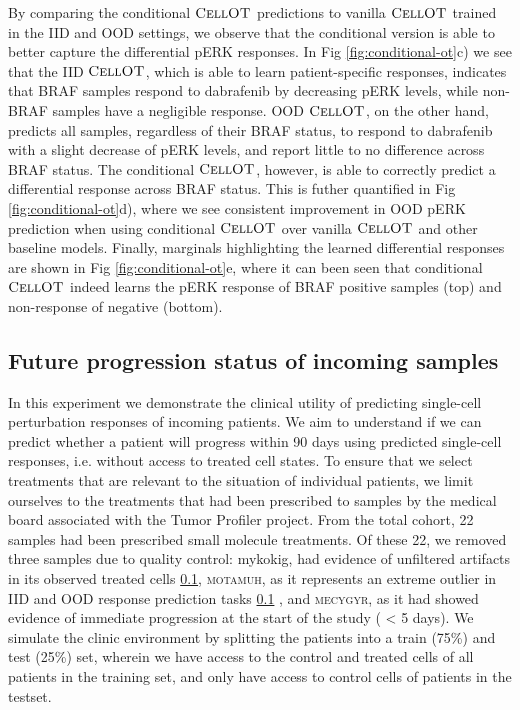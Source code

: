 By comparing the conditional $\textsc{CellOT}$ predictions to vanilla $\textsc{CellOT}$ trained in the IID and OOD settings, we observe that the conditional version is able to better capture the differential pERK responses.
In Fig \ref{fig:conditional-ot}c) we see that the IID $\textsc{CellOT}$, which is able to learn patient-specific responses, indicates that BRAF samples respond to dabrafenib by decreasing pERK levels, while non-BRAF samples have a negligible response.
OOD $\textsc{CellOT}$, on the other hand, predicts all samples, regardless of their BRAF status, to respond to dabrafenib with a slight decrease of pERK levels, and report little to no difference across BRAF status.
The conditional $\textsc{CellOT}$, however, is able to correctly predict a differential response across BRAF status.
This is futher quantified in Fig \ref{fig:conditional-ot}d), where we see consistent improvement in OOD pERK prediction when using conditional $\textsc{CellOT}$ over vanilla $\textsc{CellOT}$ and other baseline models.
Finally, marginals highlighting the learned differential responses are shown in Fig \ref{fig:conditional-ot}e,
where it can been seen that conditional $\textsc{CellOT}$ indeed learns the pERK response of BRAF positive samples (top) and non-response of negative (bottom).

\subsection{Future progression status of incoming samples}
In this experiment we demonstrate the clinical utility of predicting single-cell perturbation responses of incoming patients.
We aim to understand if we can predict whether a patient will progress within 90 days using predicted single-cell responses, i.e. without access to treated cell states.
To ensure that we select treatments that are relevant to the situation of individual patients, we limit ourselves to the treatments that had been prescribed to samples by the medical board associated with the Tumor Profiler project.
From the total cohort, 22 samples had been prescribed small molecule treatments.
Of these 22, we removed three samples due to quality control: mykokig, had evidence of unfiltered artifacts in its observed treated cells \ref{}, \textsc{motamuh}, as it represents an extreme outlier in IID and OOD response prediction tasks \ref{} , and \textsc{mecygyr}, as it had showed evidence of immediate progression at the start of the study ( < 5 days).
We simulate the clinic environment by splitting the patients into a train (75\%) and test (25\%) set, wherein we have access to the control and treated cells of all patients in the training set, and only have access to control cells of patients in the testset.

